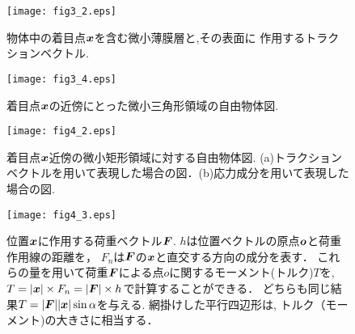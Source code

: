 \documentclass[10pt,a4j]{jbook}
\begin{document}
\begin{figure}[h]
	\begin{center}
	\texttt{[image: fig3\_2.eps]} 
	\end{center}
	\caption{物体中の着目点$\mbox{\boldmath $x$}$を含む微小薄膜層と,その表面に
	作用するトラクションベクトル. } 
	\label{fig:fig3_2}
\end{figure}
\begin{figure}[h]
	\begin{center}
	\texttt{[image: fig3\_4.eps]} 
	\end{center}
	\caption{着目点$\mbox{\boldmath $x$}$の近傍にとった微小三角形領域の自由物体図.}
	\label{fig:fig3_4}
\end{figure}
\begin{figure}[h]
	\begin{center}
	\texttt{[image: fig4\_2.eps]} 
	\end{center}
	\caption{着目点$\mbox{\boldmath $x$}$近傍の微小矩形領域に対する自由物体図.
	(a)トラクションベクトルを用いて表現した場合の図．(b)応力成分を用いて表現した場合の図.} 
	\label{fig:fig4_1}
\end{figure}
\begin{figure}[h]
	\begin{center}
	\texttt{[image: fig4\_3.eps]} 
	\end{center}
	\caption{
	位置$\mbox{\boldmath $x$}$に作用する荷重ベクトル$\mbox{\boldmath $F$}$.
	$h$は位置ベクトルの原点$\mbox{\boldmath $o$}$と荷重作用線の距離を，
	$F_n$は$\mbox{\boldmath $F$}$の$\mbox{\boldmath $x$}$と直交する方向の成分を表す．
	これらの量を用いて荷重$\mbox{\boldmath $F$}$による点$o$に関するモーメント(トルク)$T$を,
	$T=|\mbox{\boldmath $x$}|\times F_n=|\mbox{\boldmath $F$}|\times h$で計算することができる．
	どちらも同じ結果$T=|\mbox{\boldmath $F$}| |\mbox{\boldmath $x$}|\sin\alpha$を与える.
	網掛けした平行四辺形は, トルク（モーメント)の大きさに相当する．
	 } 
	\label{fig:fig4_2}
\end{figure}
\end{document}
